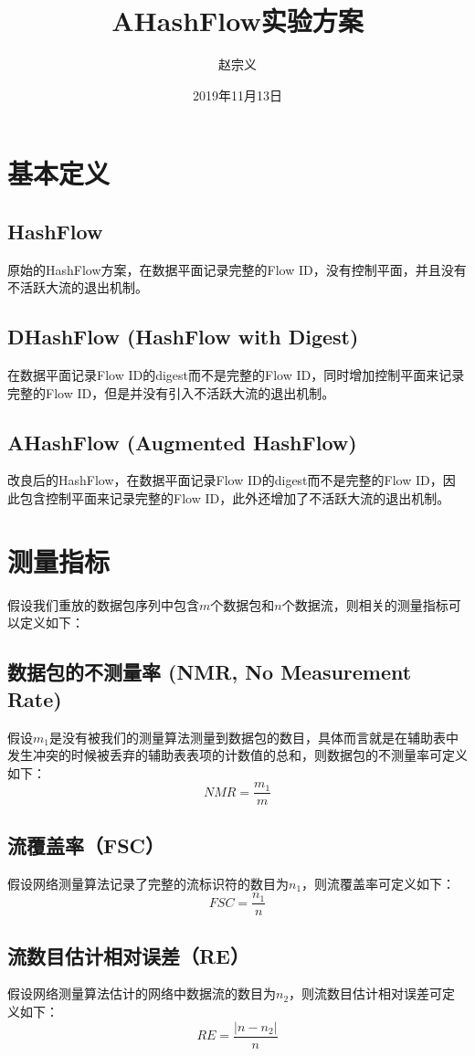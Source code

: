 \documentclass{article}
\title{AHashFlow实验方案}
\author{赵宗义}
\date{2019年11月13日}
\begin{document}
\maketitle

\tableofcontents

\section{基本定义}
\subsection{HashFlow}
原始的HashFlow方案，在数据平面记录完整的Flow ID，没有控制平面，并且没有不活跃大流的退出机制。

\subsection{DHashFlow (HashFlow with Digest)}
在数据平面记录Flow ID的digest而不是完整的Flow ID，同时增加控制平面来记录完整的Flow ID，但是并没有引入不活跃大流的退出机制。

\subsection{AHashFlow (Augmented HashFlow)}
改良后的HashFlow，在数据平面记录Flow ID的digest而不是完整的Flow ID，因此包含控制平面来记录完整的Flow ID，此外还增加了不活跃大流的退出机制。

\section{测量指标}
假设我们重放的数据包序列中包含$m$个数据包和$n$个数据流，则相关的测量指标可以定义如下：

\subsection{数据包的不测量率  (NMR, No Measurement Rate)}
假设$m_1$是没有被我们的测量算法测量到数据包的数目，具体而言就是在辅助表中发生冲突的时候被丢弃的辅助表表项的计数值的总和，则数据包的不测量率可定义如下：
$$
NMR = \frac{m_1}{m}
$$

\subsection{ 流覆盖率（FSC）}
假设网络测量算法记录了完整的流标识符的数目为$n_1$，则流覆盖率可定义如下：
$$
FSC = \frac{n_1}{n}
$$

\subsection{ 流数目估计相对误差（RE）}
假设网络测量算法估计的网络中数据流的数目为$n_2$，则流数目估计相对误差可定义如下：
$$
RE = \frac{|n - n_2|}{n}
$$
\end{document}
